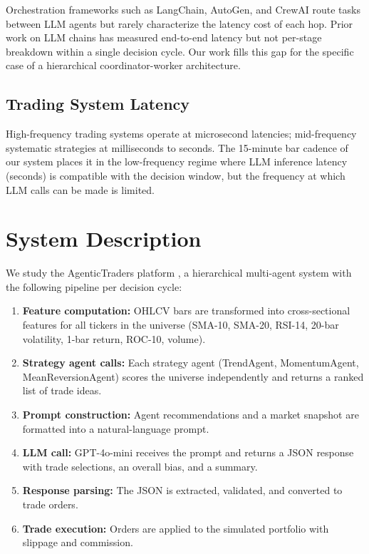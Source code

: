 \documentclass[10pt,conference]{IEEEtran}
\begin{document}
Orchestration frameworks such as LangChain, AutoGen, and CrewAI route tasks between LLM agents but rarely characterize the latency cost of each hop. Prior work on LLM chains has measured end-to-end latency but not per-stage breakdown within a single decision cycle. Our work fills this gap for the specific case of a hierarchical coordinator-worker architecture.

\subsection{Trading System Latency}

High-frequency trading systems operate at microsecond latencies; mid-frequency systematic strategies at milliseconds to seconds. The 15-minute bar cadence of our system places it in the low-frequency regime where LLM inference latency (seconds) is compatible with the decision window, but the frequency at which LLM calls can be made is limited.


\section{System Description}

We study the AgenticTraders platform \cite{companion}, a hierarchical multi-agent system with the following pipeline per decision cycle:

\begin{enumerate}
    \item \textbf{Feature computation:} OHLCV bars are transformed into cross-sectional features for all tickers in the universe (SMA-10, SMA-20, RSI-14, 20-bar volatility, 1-bar return, ROC-10, volume).
    \item \textbf{Strategy agent calls:} Each strategy agent (TrendAgent, MomentumAgent, MeanReversionAgent) scores the universe independently and returns a ranked list of trade ideas.
    \item \textbf{Prompt construction:} Agent recommendations and a market snapshot are formatted into a natural-language prompt.
    \item \textbf{LLM call:} GPT-4o-mini receives the prompt and returns a JSON response with trade selections, an overall bias, and a summary.
    \item \textbf{Response parsing:} The JSON is extracted, validated, and converted to trade orders.
    \item \textbf{Trade execution:} Orders are applied to the simulated portfolio with slippage and commission.
\end{enumerate}
\end{document}
